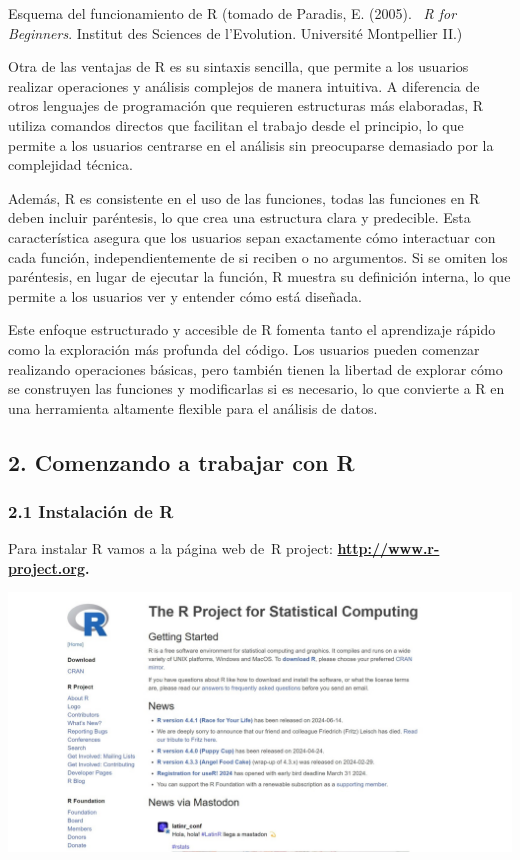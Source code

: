 \documentclass[
  letterpaper,
  DIV=11,
  numbers=noendperiod]{scrartcl}
\begin{document}
Esquema del funcionamiento de R (tomado de Paradis, E. (2005).~ \emph{R
for Beginners}. Institut des Sciences de l'Evolution. Université
Montpellier II.)

Otra de las ventajas de R es su sintaxis sencilla, que permite a los
usuarios realizar operaciones y análisis complejos de manera intuitiva.
A diferencia de otros lenguajes de programación que requieren
estructuras más elaboradas, R utiliza comandos directos que facilitan el
trabajo desde el principio, lo que permite a los usuarios centrarse en
el análisis sin preocuparse demasiado por la complejidad técnica.

Además, R es consistente en el uso de las funciones, todas las funciones
en R deben incluir paréntesis, lo que crea una estructura clara y
predecible. Esta característica asegura que los usuarios sepan
exactamente cómo interactuar con cada función, independientemente de si
reciben o no argumentos. Si se omiten los paréntesis, en lugar de
ejecutar la función, R muestra su definición interna, lo que permite a
los usuarios ver y entender cómo está diseñada.

Este enfoque estructurado y accesible de R fomenta tanto el aprendizaje
rápido como la exploración más profunda del código. Los usuarios pueden
comenzar realizando operaciones básicas, pero también tienen la libertad
de explorar cómo se construyen las funciones y modificarlas si es
necesario, lo que convierte a R en una herramienta altamente flexible
para el análisis de datos.

\hypertarget{comenzando-a-trabajar-con-r}{%
\subsection{2. Comenzando a trabajar con
R}\label{comenzando-a-trabajar-con-r}}

\hypertarget{instalaciuxf3n-de-r}{%
\subsubsection{2.1 Instalación de R}\label{instalaciuxf3n-de-r}}

Para instalar R vamos a la página web de~R project:
\href{http://www.r-project.org/}{\textbf{http://www.r-project.org}}\textbf{.}

\includegraphics{Imagenes/CRAN_2.jpeg}
\end{document}
